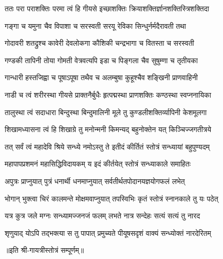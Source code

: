 \twolineshloka
{ततः परा पराशक्तिः परमा त्वं हि गीयसे}
{इच्छाशक्तिः क्रियाशक्तिर्ज्ञानशक्तिस्त्रिशक्तिदा}

\twolineshloka
{गङ्गा च यमुना चैव विपाशा च सरस्वती}
{सरयू रेविका सिन्धुर्नर्मदैरावती तथा}

\twolineshloka
{गोदावरी शतद्रुश्च कावेरी देवलोकगा}
{कौशिकी चन्द्रभागा च वितस्ता च सरस्वती}

\twolineshloka
{गण्डकी तापिनी तोया गोमती वेत्रवत्यपि}
{इडा च पिङ्गला चैव सुषुम्णा च तृतीयका}

\twolineshloka
{गान्धारी हस्तजिह्वा च पूषाऽपूषा तथैव च}
{अलम्बुषा कुहूश्चैव शङ्खिनी प्राणवाहिनी}

\twolineshloka
{नाडी च त्वं शरीरस्था गीयसे प्राक्तनैर्बुधैः}
{हृत्पद्मस्था प्राणशक्तिः कण्ठस्था स्वप्ननायिका}

\twolineshloka
{तालुस्था त्वं सदाधारा बिन्दुस्था बिन्दुमालिनी}
{मूले तु कुण्डलीशक्तिर्व्यापिनी केशमूलगा}

\twolineshloka
{शिखामध्यासना त्वं हि शिखाग्रे तु मनोन्मनी}
{किमन्यद् बहुनोक्तेन यत् किञ्चिज्जगतीत्रये}

\twolineshloka
{तत् सर्वं त्वं महादेवि श्रिये सन्ध्ये नमोऽस्तु ते}
{इतीदं कीर्तितं स्तोत्रं सन्ध्यायां बहुपुण्यदम्}

\twolineshloka
{महापापप्रशमनं महासिद्धिविदायकम्}
{य इदं कीर्तयेत् स्तोत्रं सन्ध्याकाले समाहितः}

\twolineshloka
{अपुत्रः प्राप्नुयात् पुत्रं धनार्थी धनमाप्नुयात्}
{सर्वतीर्थतपोदानयज्ञयोगफलं लभेत्}

\twolineshloka
{भोगान् भुक्त्वा चिरं कालमन्ते मोक्षमवाप्नुयात्}
{तपस्विभिः कृतं स्तोत्रं स्नानकाले तु यः पठेत्}

\twolineshloka
{यत्र कुत्र जले मग्नः सन्ध्यामज्जनजं फलम्}
{लभते नात्र सन्देहः सत्यं सत्यं तु नारद}

\twolineshloka
{शृणुयाद् योऽपि तद्भक्त्या स तु पापात् प्रमुच्यते}
{पीयूषसदृशं वाक्यं सन्ध्योक्तं नारदेरितम्}

॥इति श्री-गायत्रीस्तोत्रं सम्पूर्णम्॥